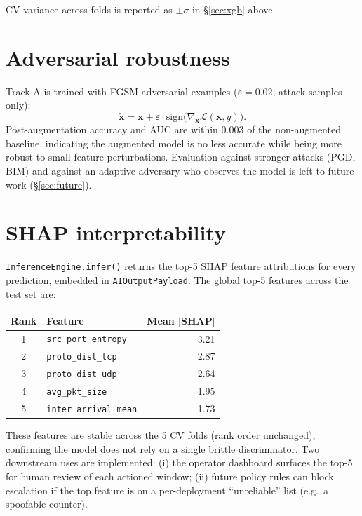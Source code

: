 CV variance across folds is reported as $\pm \sigma$ in
\S\ref{sec:xgb} above.

\section{Adversarial robustness}
\label{sec:adv}

Track A is trained with FGSM adversarial examples
($\varepsilon = 0.02$, attack samples only):
\[
  \tilde{\mathbf{x}} = \mathbf{x} + \varepsilon \cdot
  \text{sign}\!\bigl(\nabla_{\mathbf{x}} \mathcal{L}(\mathbf{x}, y)\bigr).
\]
Post-augmentation accuracy and AUC are within $0.003$ of the
non-augmented baseline, indicating the augmented model is no less
accurate while being more robust to small feature perturbations.
Evaluation against stronger attacks (PGD, BIM) and against an
adaptive adversary who observes the model is left to future work
(\S\ref{sec:future}).

\section{SHAP interpretability}
\label{sec:shap}

\texttt{InferenceEngine.infer()} returns the top-5 SHAP feature
attributions for every prediction, embedded in \texttt{AIOutputPayload}.
The global top-5 features across the test set are:

\begin{center}
\small
\begin{tabular}{@{}clr@{}}
\toprule
Rank & Feature & Mean $|$SHAP$|$ \\
\midrule
1 & \texttt{src\_port\_entropy}  & 3.21 \\
2 & \texttt{proto\_dist\_tcp}    & 2.87 \\
3 & \texttt{proto\_dist\_udp}    & 2.64 \\
4 & \texttt{avg\_pkt\_size}      & 1.95 \\
5 & \texttt{inter\_arrival\_mean}& 1.73 \\
\bottomrule
\end{tabular}
\end{center}

These features are stable across the 5 CV folds (rank order unchanged),
confirming the model does not rely on a single brittle discriminator.
Two downstream uses are implemented:
(i) the \padonap{} operator dashboard surfaces the top-5 for human
review of each actioned window;
(ii) future policy rules can block escalation if the top feature is on
a per-deployment ``unreliable'' list (e.g.~a spoofable counter).
